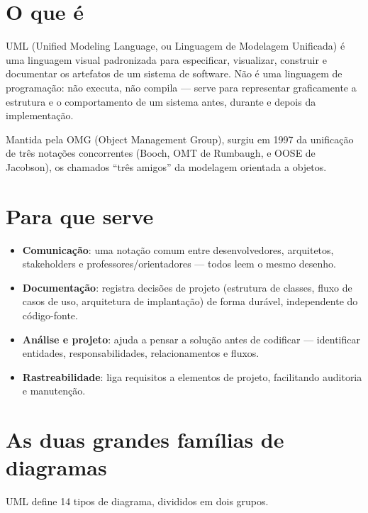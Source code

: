 \documentclass[11pt,a4paper]{article}
\title{\vspace{-2em}{\Large\bfseries UML --- Unified Modeling Language}}
\author{}
\date{}
\begin{document}
\maketitle
\vspace{-3em}

\section*{O que é}

UML (Unified Modeling Language, ou Linguagem de Modelagem Unificada) é uma
linguagem visual padronizada para especificar, visualizar, construir e
documentar os artefatos de um sistema de software. Não é uma linguagem de
programação: não executa, não compila --- serve para representar
graficamente a estrutura e o comportamento de um sistema antes, durante e
depois da implementação.

Mantida pela OMG (Object Management Group), surgiu em 1997 da unificação de
três notações concorrentes (Booch, OMT de Rumbaugh, e OOSE de Jacobson), os
chamados ``três amigos'' da modelagem orientada a objetos.

\section*{Para que serve}

\begin{itemize}
  \item \textbf{Comunicação}: uma notação comum entre desenvolvedores,
    arquitetos, stakeholders e professores/orientadores --- todos leem o
    mesmo desenho.
  \item \textbf{Documentação}: registra decisões de projeto (estrutura de
    classes, fluxo de casos de uso, arquitetura de implantação) de forma
    durável, independente do código-fonte.
  \item \textbf{Análise e projeto}: ajuda a pensar a solução antes de
    codificar --- identificar entidades, responsabilidades,
    relacionamentos e fluxos.
  \item \textbf{Rastreabilidade}: liga requisitos a elementos de projeto,
    facilitando auditoria e manutenção.
\end{itemize}

\section*{As duas grandes famílias de diagramas}

UML define 14 tipos de diagrama, divididos em dois grupos.
\end{document}
